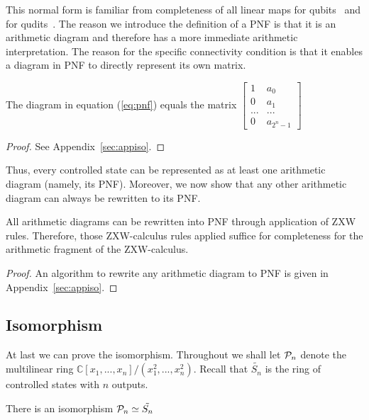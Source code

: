 This normal form is familiar from completeness of all linear maps for qubits~\cite{Hadzihasanovic2018zwzxcomplete} and for qudits~\cite{poor2023completeness}. The reason we introduce the definition of a PNF is that it is an arithmetic diagram and therefore has a more immediate arithmetic interpretation. The reason for the specific connectivity condition is that it enables a diagram in PNF to directly represent its own matrix.

\begin{prop}\label{prop:vec_pnf}
The diagram in equation (\ref{eq:pnf}) equals the matrix
    $\begin{bmatrix}
            1 &  a_0 \\ 0 & a_1 \\ ... & ... \\ 0 & a_{2^n-1}
        \end{bmatrix}$
\end{prop} 

\begin{proof}
    See Appendix~\ref*{sec:appiso}.
\end{proof}

Thus, every controlled state can be represented as at least one arithmetic diagram (namely, its PNF). Moreover, we now show that any other arithmetic diagram can always be rewritten to its PNF.


\begin{thm}\label{thm:uni_pnf}
    All arithmetic diagrams can be rewritten into PNF through application of ZXW rules. Therefore, those ZXW-calculus rules applied suffice for completeness for the arithmetic fragment of the ZXW-calculus.
\end{thm}

\begin{proof}
    An algorithm to rewrite any arithmetic diagram to PNF is given in Appendix~\ref*{sec:appiso}.
\end{proof}

\subsection{Isomorphism}

At last we can prove the isomorphism. Throughout we shall let $\mathcal{P}_{n}$ denote the multilinear ring $\mathbb{C}[x_1, ..., x_{n}]/(x_1^2, ..., x_{n}^2)$. Recall that $\tilde{S_n}$ is the ring of controlled states with $n$ outputs. 


\begin{thm}\label{thm:iso}
    There is an isomorphism $\mathcal{P}_{n} \simeq \tilde{S_n}$
\end{thm}

